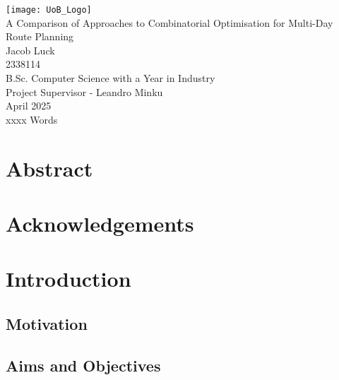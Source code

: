 \documentclass[a4paper,12pt]{article}
\renewcommand{\includegraphics}[2][]{\fbox{}}
\begin{document}
    \begin{titlepage}
        \centering
        \vspace*{8ex}
        \texttt{[image: UoB\_Logo]}\\[10ex]
        \Huge{A Comparison of Approaches to Combinatorial Optimisation for Multi-Day Route Planning}\\[3ex]
        \LARGE{Jacob Luck}\\
        \large{2338114}\\[18ex]
        \Large{B.Sc. Computer Science with a Year in Industry}\\
        \Large{Project Supervisor - Leandro Minku}\\[6ex]
        \large{April 2025}\\
        \large{xxxx Words}
    \end{titlepage}

    \doublespacing

    \section*{Abstract}\label{sec:abstract}

    \pagebreak

    \section*{Acknowledgements}\label{sec:acknowledgements}

    \pagebreak

    \tableofcontents

    \pagebreak

    \section{Introduction}\label{sec:introduction}
    \subsection{Motivation}\label{subsec:motivation}
    \subsection{Aims and Objectives}\label{subsec:aims-and-objectives}
\end{document}
